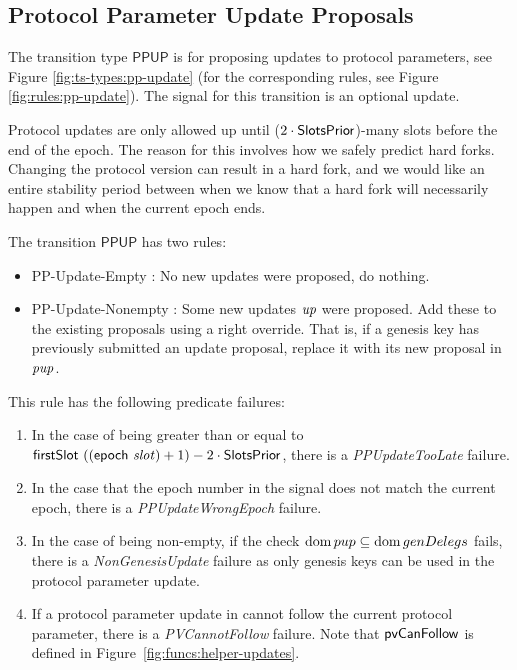 \subsection{Protocol Parameter Update Proposals}
\label{sec:pp-proposals}

The transition type $\mathsf{PPUP}$ is for proposing updates to protocol
parameters, see Figure \ref{fig:ts-types:pp-update} (for the corresponding rules,
see Figure \ref{fig:rules:pp-update}).
The signal for this transition is an optional update.

Protocol updates are only allowed up until ($2\cdot\mathsf{SlotsPrior}$)-many slots before the
end of the epoch. The reason for this involves how we safely predict hard forks.
Changing the protocol version can result in a hard fork, and we would like an
entire stability period between when we know that a hard fork will necessarily happen
and when the current epoch ends.

The transition $\mathsf{PPUP}$ has two rules:
\begin{itemize}
  \item PP-Update-Empty : No new updates were proposed, do nothing.
  \item PP-Update-Nonempty : Some new updates $\mathit{up}$ were proposed.
  Add these to the existing proposals using a right override. That is, if a genesis key
  has previously submitted an update proposal, replace it with its new
  proposal in $\mathit{pup}$.
\end{itemize}

This rule has the following predicate failures:

\begin{enumerate}
\item In the case of  being greater than or equal to
  $\mathsf{firstSlot}~((\mathsf{epoch}~\mathit{slot}) + 1) - 2\cdot\mathsf{SlotsPrior}$, there is
  a \emph{PPUpdateTooLate} failure.
\item In the case that the epoch number in the signal does not match the current epoch,
  there is a \emph{PPUpdateWrongEpoch} failure.
\item In the case of  being non-empty, if the check $\operatorname{dom} pup \subseteq
  \operatorname{dom} genDelegs$ fails, there is a \emph{NonGenesisUpdate} failure as only genesis keys
  can be used in the protocol parameter update.
\item If a protocol parameter update in  cannot follow the current
  protocol parameter, there is a \emph{PVCannotFollow} failure.
  Note that $\mathsf{pvCanFollow}$ is defined in Figure~\ref{fig:funcs:helper-updates}.
\end{enumerate}

